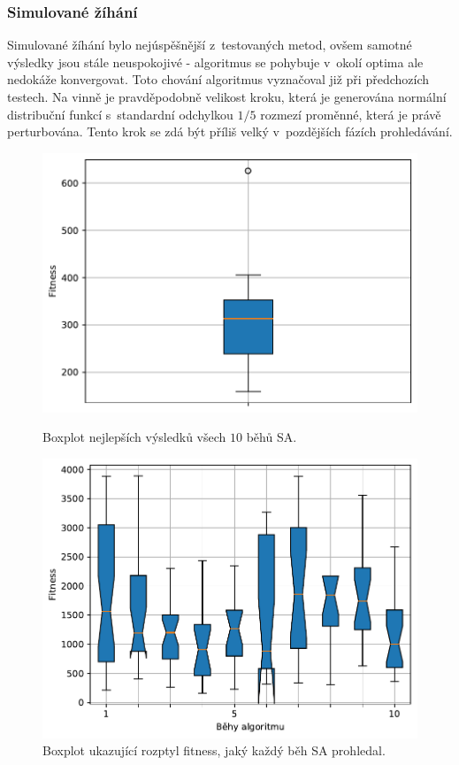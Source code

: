 \subsubsection{Simulované žíhání}
Simulované žíhání bylo nejúspěšnější z~testovaných metod, ovšem samotné výsledky jsou stále neuspokojivé - algoritmus se pohybuje v~okolí optima ale nedokáže konvergovat. Toto chování algoritmus vyznačoval již při předchozích testech. Na vinně je pravděpodobně velikost kroku, která je generována normální distribuční funkcí s~standardní odchylkou $1/5$ rozmezí proměnné, která je právě perturbována. Tento krok se zdá být příliš velký v~pozdějších fázích prohledávání.

\begin{figure}[H]
\begin{minipage}[t]{0.475\linewidth}
\includegraphics[width=\linewidth]{obrazky-figures/statistics/HIFU/flower/15/SA/bestsBoxplot_WithOutliers.pdf}
\caption{Boxplot nejlepších výsledků všech $10$ běhů SA.}
\label{fg:hifu:flower:sa:best}
\end{minipage}
\hfill
\begin{minipage}[t]{0.475\linewidth}
\includegraphics[width=\linewidth]{obrazky-figures/statistics/HIFU/flower/15/SA/lastGenBoxplots.pdf}
\caption{Boxplot ukazující rozptyl fitness, jaký každý běh SA prohledal.}
\label{fg:hifu:flower:sa:lastGen}
\end{minipage}
\end{figure}

